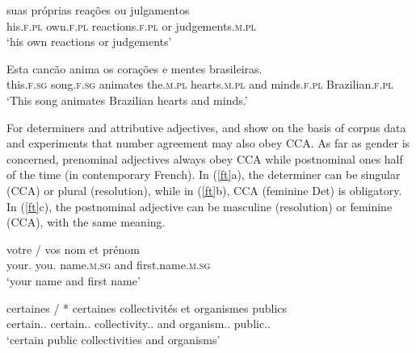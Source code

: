 {\begin{exe}
 \ex
\begin{xlista}
\ex \gll suas pr\'{o}prias rea\c{c}\~{o}es ou julgamentos \\
his.\textsc{f.pl} own.\textsc{f.pl} reactions.\textsc{f.pl} or judgements.\textsc{m.pl} \\
\glt `his own reactions or judgements' \citep[435]{Villavicencio:Sadler:ea:05}  


\ex \gll Esta canc\~{a}o anima os cora\c{c}\~{o}es e mentes brasileiras. \\
 this.\textsc{f.sg}  song.\textsc{f.sg} animates the.\textsc{m.pl} hearts.\textsc{m.pl} and minds.\textsc{f.pl} Brazilian.\textsc{f.pl} \\
\glt `This song animates Brazilian hearts and minds.' \citep[437]{Villavicencio:Sadler:ea:05} 
\end{xlista} \label{fo}
\end{exe}

For  determiners and attributive adjectives, \citet{An:Abeille:17} and \citet{Abeille:An:Shiraishi:18} show on the basis of corpus data and experiments that number agreement may also obey CCA. As far as gender is concerned, prenominal adjectives always obey CCA while postnominal ones half of the time (in contemporary French). In (\ref{ft}a), the determiner can be singular (CCA) or plural (resolution), while in (\ref{ft}b), CCA (feminine Det) is obligatory. In (\ref{ft}c), the postnominal adjective can be masculine (resolution) or feminine (CCA), with the same meaning.

\begin{exe}
 \ex
\begin{xlista}
\ex  
\gll votre / vos nom et pr\'{e}nom \\
     your.\SG{} {} you.\PL{} name.\textsc{m.sg} and first.name.\textsc{m.sg} \\
\glt `your name and first name' \citep[]{An:Abeille:17}

\ex 
\gll certaines          / *   certaines collectivités et organismes publics \\
     certain.\F.\PL{} {} {} certain.\F.\PL{} collectivity.\F.\PL{} and organism.\MAS.\PL{} public.\MAS.\PL{} \\
\glt `certain public collectivities and organisms' \citep[]{Abeille:An:Shiraishi:18}


\end{xlista}
\end{exe}}
